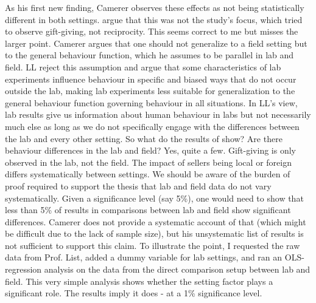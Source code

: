 \documentclass{article}
\begin{document}
As his first new finding, Camerer observes these effects as not being statistically different in both settings. \citet{AlUbaydli.2013} argue that this was not the study's focus, which tried to observe gift-giving, not reciprocity. This seems correct to me but misses the larger point. Camerer argues that one should not generalize to a field setting but to the general behaviour function, which he assumes to be parallel in lab and field. LL reject this assumption and argue that some characteristics of lab experiments influence behaviour in specific and biased ways that do not occur outside the lab, making lab experiments less suitable for generalization to the general behaviour function governing behaviour in all situations. In LL's view, lab results give us information about human behaviour in labs but not necessarily much else as long as we do not specifically engage with the differences between the lab and every other setting. So what do the results of \citet{List.2006} show? Are there behaviour differences in the lab and field? Yes, quite a few. Gift-giving is only observed in the lab, not the field. The impact of sellers being local or foreign differs systematically between settings. We should be aware of the burden of proof required to support the thesis that lab and field data do not vary systematically. Given a significance level (say 5\%), one would need to show that less than 5\% of results in comparisons between lab and field show significant differences. Camerer does not provide a systematic account of that (which might be difficult due to the lack of sample size), but his unsystematic list of results is not sufficient to support this claim. 
To illustrate the point, I requested the raw data from Prof. List, added a dummy variable for lab settings, and ran an OLS-regression analysis on the data from the direct comparison setup between lab and field. This very simple analysis shows whether the setting factor plays a significant role. The results imply it does - at a 1\% significance level. 
\\
\\
\end{document}
